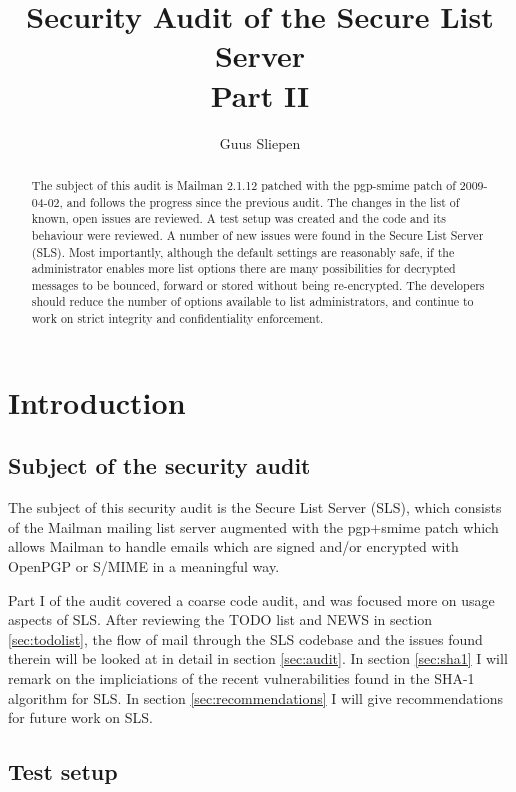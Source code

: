 \documentclass[a4]{article}
\title{Security Audit of the Secure List Server\\
Part II}
\author{Guus Sliepen \email{guus@sliepen.org}}
\begin{document}
\maketitle

\begin{abstract}
The subject of this audit is Mailman 2.1.12 patched with the pgp-smime patch of 2009-04-02,
and follows the progress since the previous audit.
The changes in the list of known, open issues are reviewed.
A test setup was created and the code and its behaviour were reviewed.
A number of new issues were found in the Secure List Server (SLS).
Most importantly, although the default settings are reasonably safe,
if the administrator enables more list options
there are many possibilities for decrypted messages to be bounced, forward or stored without being re-encrypted.
The developers should reduce the number of options available to list administrators,
and continue to work on strict integrity and confidentiality enforcement.
\end{abstract}

\setlength{\parindent}{0pt}
\setlength{\parskip}{1.5ex}

\section{Introduction}\label{sec:intro}

\subsection{Subject of the security audit}\label{sec:subject}

The subject of this security audit is the Secure List Server (SLS),
which consists of the Mailman mailing list server
augmented with the pgp+smime patch which allows Mailman to handle emails
which are signed and/or encrypted with OpenPGP or S/MIME in a meaningful way.

Part I of the audit covered a coarse code audit, and was focused more on usage aspects of SLS.
After reviewing the TODO list and NEWS in section \ref{sec:todolist},
the flow of mail through the SLS codebase and the issues found therein will be looked at in detail in section \ref{sec:audit}.
In section \ref{sec:sha1} I will remark on the impliciations of the recent vulnerabilities found in the SHA-1 algorithm for SLS.
In section \ref{sec:recommendations} I will give recommendations for future work on SLS.

\subsection{Test setup}\label{sec:setup}
\end{document}
